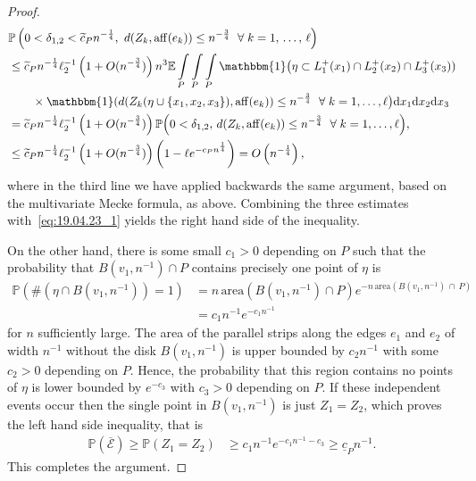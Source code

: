 \documentclass[10pt]{amsart}
\theoremstyle{definition}\newtheorem{defi}[theo]{Definition}\newtheorem{rema}[theo]{Remark}\newtheorem{exam}[theo]{Example}\newtheorem{exem}[theo]{Example}\newtheorem{nota}[theo]{Notation}
\newcommand{\ind}{\mathbbm{1}}
\newcommand{\bbE}{\mathbb{E}}
\newcommand{\bbP}{\mathbb{P}}
\newcommand{\clE}{\mathcal{E}}
\newcommand{\area}{\mathrm{area}}
\newcommand{\aff}{\mathrm{aff}}
\let\oldtilde\tilde
\renewcommand*{\tilde}[1]{\mathchoice{\widetilde{#1}}{\widetilde{#1}}{\oldtilde{#1}}{\oldtilde{#1}}}
\let\oldforall\forall
\renewcommand*{\forall}{\mathrel{\oldforall}}
\begin{document}
\begin{proof}
\begin{align*}
&\bbP \left(0<\delta_{1,2} < \tilde c_P n^{- \frac 14}, \ d(Z_k, \aff(e_k)) \leq n^{- \frac 34} \ \forall k=1,\,\ldots,\,\ell \right)
\\ & \leq
\tilde c_P n^{- \frac 14} \ell_2^{-1} \left(1+O(n^{- \frac 34})\right) n^3 \bbE \int\limits_{P}\int\limits_{P}\int\limits_{P}
\ind \big(\eta \subset L_1^+(x_1) \cap L_2^+ (x_2)\cap L_3^+ (x_3))\\
&\qquad \times
\ind(d(Z_k(\eta\cup\{x_1,x_2,x_3\}), \aff(e_k)) \leq n^{- \frac 34} \ \forall k=1,\ldots,\ell \big)\mathrm{d} x_1\mathrm{d} x_2\mathrm{d} x_3
\\ & =
\tilde c_P n^{- \frac 14} \ell_2^{-1} \left(1+O(n^{- \frac 34})\right) \bbP\Big(0<\delta_{1,2},\, d(Z_k, \aff(e_k)) \leq n^{- \frac 34} \ \forall k=1,\ldots,\ell \Big),
\\ & \leq
\tilde c_P n^{- \frac 14} \ell_2^{-1} \left(1+O(n^{- \frac 34})\right) \left(1- \ell e^{-c_P n^{\frac 14}}\right) = O\left(n^{- \frac 14}\right),
\end{align*}
where in the third line we have applied backwards the same argument, based on the multivariate Mecke formula, as above. Combining the three estimates with~\eqref{eq:19.04.23_1} yields the right hand side of the inequality.

On the other hand, there is some small $c_1>0$ depending on $P$ such that the probability that $B(v_1, n^{-1}) \cap P$ contains precisely one point of $\eta$ is
\begin{align*}
\bbP\left(\#(\eta \cap B(v_1, n^{- 1})) = 1\right) &= n\, {\area}\left(B(v_1, n^{- 1}) \cap P\right) e^{- n\, {\area}\left(B\left(v_1, n^{- 1}\right)\,\cap\,P\right) } \\
&= c_1 n^{- 1} e^{-c_1 n^{- 1}}
\end{align*}
for $n$ sufficiently large. The area of the parallel strips along the edges $e_1$ and $e_{2}$ of width $n^{- 1}$ without the disk $B(v_1, n^{- 1})$ is upper bounded by $c_2 n^{-1}$ with some $c_2>0 $ depending on $P$. Hence, the probability that this region contains no points of $\eta$ is lower bounded by $ e^{- c_3} $ with $c_3>0$ depending on $P$. If these independent events occur then the single point in $B(v_1, n^{- 1})$ is just $Z_1=Z_2$, which proves the left hand side inequality, that is
\begin{align*}
\bbP(\overline{\clE})
\geq
\bbP(Z_1=Z_{2}) & \geq c_1 n^{- 1} e^{-c_1 n^{- 1} -c_3}
\geq \underline{c}_P n^{- 1}.
\end{align*}
This completes the argument.
\end{proof}
\end{document}
